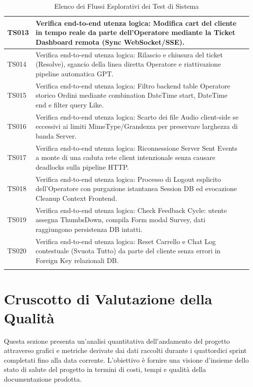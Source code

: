 \documentclass[a4paper,11pt,oneside]{scrartcl}
\begin{document}
\begin{longtable}{|p{1.9cm}|p{11.6cm}|c|}
TS013 & Verifica end-to-end utenza logica: Modifica cart del cliente in tempo reale da parte dell'Operatore mediante la Ticket Dashboard remota (Sync WebSocket/SSE). & \\ \hline
TS014 & Verifica end-to-end utenza logica: Rilascio e chiusura del ticket (Resolve), sgancio della linea diretta Operatore e riattivazione pipeline automatica GPT. & \\ \hline
TS015 & Verifica end-to-end utenza logica: Filtro backend table Operatore storico Ordini mediante combination DateTime start, DateTime end e filter query Like. & \\ \hline
TS016 & Verifica end-to-end utenza logica: Scarto dei file Audio client-side se eccessivi ai limiti MimeType/Grandezza per preservare larghezza di banda Server. & \\ \hline
TS017 & Verifica end-to-end utenza logica: Riconnessione Server Sent Events a monte di una caduta rete client intenzionale senza causare deadlocks sulla pipeline HTTP. & \\ \hline
TS018 & Verifica end-to-end utenza logica: Processo di Logout esplicito dell'Operatore con purgazione istantanea Session DB ed evocazione Cleanup Context Frontend. & \\ \hline
TS019 & Verifica end-to-end utenza logica: Check Feedback Cycle: utente assegna ThumbsDown, compila Form modal Survey, dati raggiungono persistenza DB intatti. & \\ \hline
TS020 & Verifica end-to-end utenza logica: Reset Carrello e Chat Log contestuale (Svuota Tutto) da parte del cliente senza errori in Foreign Key relazionali DB. & \\ \hline
\caption{Elenco dei Flussi Esplorativi dei Test di Sistema}
\end{longtable}


\newpage
\section{Cruscotto di Valutazione della Qualità}

Questa sezione presenta un'analisi quantitativa dell'andamento del progetto attraverso grafici e metriche derivate dai dati raccolti durante i quattordici sprint completati fino alla data corrente. L'obiettivo è fornire una visione d'insieme dello stato di salute del progetto in termini di costi, tempi e qualità della documentazione prodotta.
\end{document}
